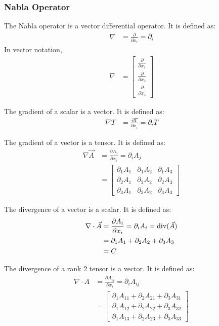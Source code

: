 \subsubsection{Nabla Operator}
The Nabla operator is a vector differential operator. It is defined as:
\begin{align*}
    \nabla &= \frac{\partial}{\partial x_i} = \partial_{i} 
\end{align*}
In vector notation,
\begin{align*}
    \nabla &= \begin{bmatrix}
        \frac{\partial}{\partial x_1} \\
        \frac{\partial}{\partial x_2} \\
        \frac{\partial}{\partial x_3}
    \end{bmatrix}
\end{align*}

The gradient of a scalar is a vector. It is defined as:
\begin{align*}
    \nabla T &= \frac{\partial T}{\partial x_i} = \partial_{i} T
\end{align*}

The gradient of a vector is a tensor. It is defined as:
\begin{align*}
    \nabla \vec{A} &= \frac{\partial A_j}{\partial x_i} = \partial_{i} A_j \\
    &= \begin{bmatrix}
        \partial_{1} A_1 & \partial_{1} A_2 & \partial_{1} A_3 \\
        \partial_{2} A_1 & \partial_{2} A_2 & \partial_{2} A_3 \\
        \partial_{3} A_1 & \partial_{3} A_2 & \partial_{3} A_3
    \end{bmatrix}
\end{align*}

The divergence of a vector is a scalar. It is defined as:
\begin{align*}
    \nabla \cdot \vec{A} &= \frac{\partial A_i}{\partial x_i} = \partial_{i} A_i = \operatorname{div}(\vec{A}) \\
    &= \partial_{1} A_1 + \partial_{2} A_2 + \partial_{3} A_3 \\
    &= C
\end{align*}

The divergence of a rank 2 tensor is a vector. It is defined as:
\begin{align*}
    \nabla \cdot A &= \frac{\partial A_{ij}}{\partial x_i} = \partial_{i} A_{ij} \\
    &= \begin{bmatrix}
        \partial_{1} A_{11} + \partial_{2} A_{21} + \partial_{3} A_{31} \\
        \partial_{1} A_{12} + \partial_{2} A_{22} + \partial_{3} A_{32} \\
        \partial_{1} A_{13} + \partial_{2} A_{23} + \partial_{3} A_{33}
    \end{bmatrix}
\end{align*}


